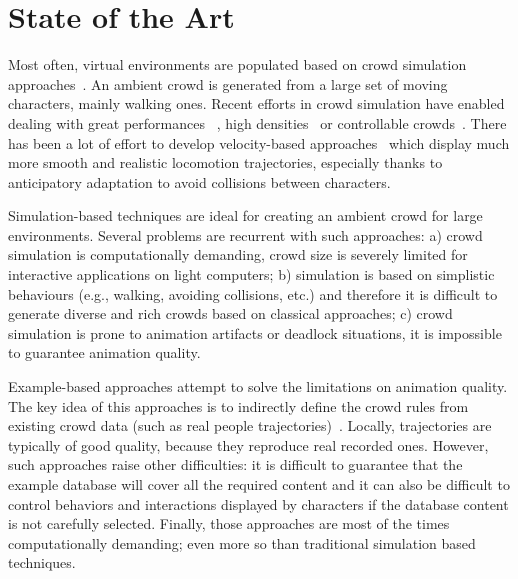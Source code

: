 \section{State of the Art}
\label{sec:star}

Most often, virtual environments are populated based on crowd simulation approaches~\cite{ThalmannBook:2013}.
An ambient crowd is generated from a large set of moving characters, mainly walking ones.
Recent efforts in crowd simulation have enabled dealing with great performances ~\cite{PettreCAVW:2006,Treuille:2006}, high densities~\cite{Narain:2009} or controllable crowds~\cite{Guy:2009}.
There has been a lot of effort to develop velocity-based approaches~\cite{Paris:2007,VanDenBerg:2008} which display much more smooth and realistic locomotion trajectories, especially thanks to anticipatory adaptation to avoid collisions between characters. 


Simulation-based techniques are ideal for creating an ambient crowd for large environments.
Several problems are recurrent with such approaches:
a) crowd simulation is computationally demanding, crowd size is severely limited for interactive applications on light computers;
b) simulation is based on simplistic behaviours (e.g., walking, avoiding collisions, etc.) and therefore it is difficult to generate diverse and rich crowds based on classical approaches;
c) crowd simulation is prone to animation artifacts or deadlock situations, it is impossible to guarantee animation quality. 

Example-based approaches attempt to solve the limitations on animation quality.
The key idea of this approaches is to indirectly define the crowd rules from existing crowd data (such as real people trajectories)~\cite{Lerner:2007,Ju:2010,Charalambous:2014}.
Locally, trajectories are typically of good quality, because they reproduce real recorded ones.
However, such approaches raise other difficulties: it is difficult to guarantee that the example database will cover all the required content and it can also be difficult to control behaviors and interactions displayed by characters if the database content is not carefully selected.
Finally, those approaches are most of the times computationally demanding; even more so than traditional simulation based techniques.


